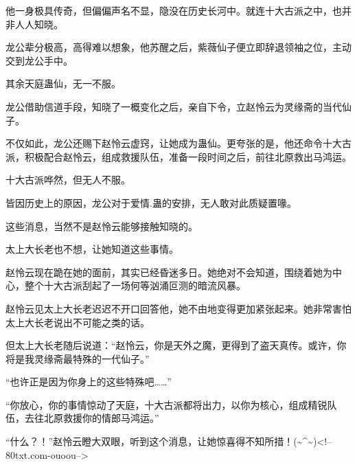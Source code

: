 \begin{this_body}
他一身极具传奇，但偏偏声名不显，隐没在历史长河中。就连十大古派之中，也并非人人知晓。

龙公辈分极高，高得难以想象，他苏醒之后，紫薇仙子便立即辞退领袖之位，主动交到龙公手中。

其余天庭蛊仙，无一不服。

龙公借助信道手段，知晓了一概变化之后，亲自下令，立赵怜云为灵缘斋的当代仙子。

不仅如此，龙公还赐下赵怜云虚窍，让她成为蛊仙。更夸张的是，他还命令十大古派，积极配合赵怜云，组成救援队伍，准备一段时间之后，前往北原救出马鸿运。

十大古派哗然，但无人不服。

皆因历史上的原因，龙公对于爱情.蛊的安排，无人敢对此质疑置喙。

这些消息，当然不是赵怜云能够接触知晓的。

太上大长老也不想，让她知道这些事情。

赵怜云现在跪在她的面前，其实已经昏迷多日。她绝对不会知道，围绕着她为中心，整个十大古派刮起了一场何等汹涌叵测的暗流风暴。

赵怜云见太上大长老迟迟不开口回答他，她不由地变得更加紧张起来。她非常害怕太上大长老说出不可能之类的话。

但太上大长老随后说道：“赵怜云，你是天外之魔，更得到了盗天真传。或许，你将是我灵缘斋最特殊的一代仙子。”

“也许正是因为你身上的这些特殊吧……”

“你放心，你的事情惊动了天庭，十大古派都将出力，以你为核心，组成精锐队伍，去往北原救援你的情郎马鸿运。”

“什么？！”赵怜云瞪大双眼，听到这个消息，让她惊喜得不知所措！(\~{}\^{}\~{})<!--80txt.com-ouoou-->

\end{this_body}


